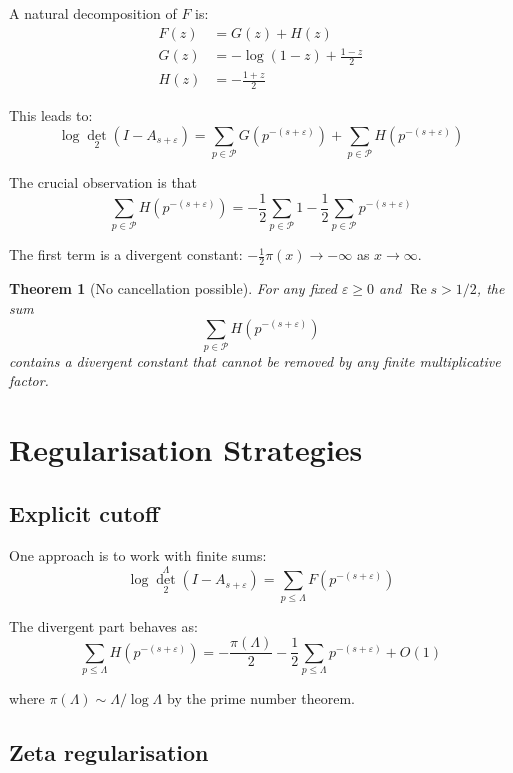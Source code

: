 \documentclass[11pt,a4paper]{article}
\newtheorem{theorem}{Theorem}[section]
\theoremstyle{definition}
\theoremstyle{remark}
\newcommand{\calP}{\mathcal{P}}
\DeclareMathOperator{\det}{det}
\DeclareMathOperator{\Re}{Re}
\begin{document}
A natural decomposition of $F$ is:
\begin{align}
F(z) &= G(z) + H(z)\\
G(z) &= -\log(1-z) + \frac{1-z}{2}\\
H(z) &= -\frac{1+z}{2}
\end{align}

This leads to:
\[
\log \det_2(I - A_{s+\varepsilon}) = \sum_{p \in \calP} G(p^{-(s+\varepsilon)}) + \sum_{p \in \calP} H(p^{-(s+\varepsilon)})
\]

The crucial observation is that
\[
\sum_{p \in \calP} H(p^{-(s+\varepsilon)}) = -\frac{1}{2}\sum_{p \in \calP} 1 - \frac{1}{2}\sum_{p \in \calP} p^{-(s+\varepsilon)}
\]

The first term is a divergent constant: $-\frac{1}{2}\pi(x) \to -\infty$ as $x \to \infty$.

\begin{theorem}[No cancellation possible]\label{thm:no-cancel}
For any fixed $\varepsilon \geq 0$ and $\Re s > 1/2$, the sum
\[
\sum_{p \in \calP} H(p^{-(s+\varepsilon)})
\]
contains a divergent constant that cannot be removed by any finite multiplicative factor.
\end{theorem}

\section{Regularisation Strategies}\label{sec:regularisation}

\subsection{Explicit cutoff}

One approach is to work with finite sums:
\[
\log \det_2^\Lambda(I - A_{s+\varepsilon}) = \sum_{p \leq \Lambda} F(p^{-(s+\varepsilon)})
\]

The divergent part behaves as:
\[
\sum_{p \leq \Lambda} H(p^{-(s+\varepsilon)}) = -\frac{\pi(\Lambda)}{2} - \frac{1}{2}\sum_{p \leq \Lambda} p^{-(s+\varepsilon)} + O(1)
\]

where $\pi(\Lambda) \sim \Lambda/\log \Lambda$ by the prime number theorem.

\subsection{Zeta regularisation}
\end{document}
